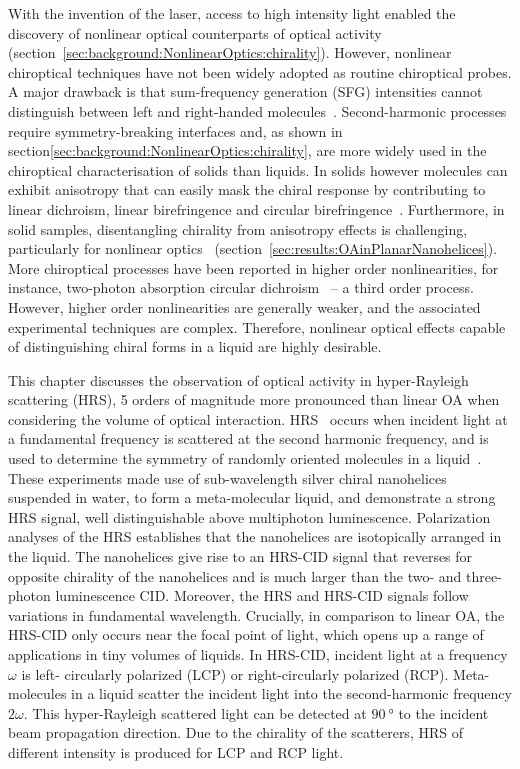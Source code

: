 With the invention of the laser, access to high intensity light enabled the discovery of nonlinear optical counterparts of optical activity (section~\ref{sec:background:NonlinearOptics:chirality}). However, nonlinear chiroptical techniques have not been widely adopted as routine chiroptical probes. A major drawback is that sum-frequency generation (SFG) intensities cannot distinguish between left and right-handed molecules~\cite{Valev2013b}. 
Second-harmonic processes require symmetry-breaking interfaces and, as shown in section\ref{sec:background:NonlinearOptics:chirality}, are more widely used in the chiroptical characterisation of solids than liquids. In solids however molecules can exhibit anisotropy that can easily mask the chiral response by contributing to linear dichroism, linear birefringence and circular birefringence~\cite{Kuroda2001}.
Furthermore, in solid samples, disentangling chirality from anisotropy effects is challenging, particularly for nonlinear optics~\cite{Hooper2017} (section~\ref{sec:results:OAinPlanarNanohelices}). More chiroptical processes have been reported in higher order nonlinearities, for instance, two-photon absorption circular dichroism~\cite{Tinoco1975, DeBoni2008, Toro2010} – a third order process. However, higher order nonlinearities are generally weaker, and the associated experimental techniques are complex. Therefore, nonlinear optical effects capable of distinguishing chiral forms in a liquid are highly desirable. 

This chapter discusses the observation of optical activity in hyper-Rayleigh scattering (HRS), 5 orders of magnitude more pronounced than linear OA when considering the volume of optical interaction. HRS~\cite{Clays1991b, Clays1992} occurs when incident light at a fundamental frequency is scattered at the second harmonic frequency, and is used to determine the symmetry of randomly oriented molecules in a liquid~\cite{Verbiest1994a}.
These experiments made use of sub-wavelength silver chiral nanohelices suspended in water, to form a meta-molecular liquid, and demonstrate a strong HRS signal, well distinguishable above multiphoton luminescence. Polarization analyses of the HRS establishes that the nanohelices are isotopically arranged in the liquid. The nanohelices give rise to an HRS-CID signal that reverses for opposite chirality of the nanohelices and is much larger than the two- and three-photon luminescence CID. Moreover, the HRS and HRS-CID signals follow variations in fundamental wavelength. Crucially, in comparison to linear OA, the HRS-CID only occurs near the focal point of light, which opens up a range of applications in tiny volumes of liquids. 
In HRS-CID, incident light at a frequency $\omega$ is left- circularly polarized (LCP) or right-circularly polarized (RCP). Meta-molecules in a liquid scatter the incident light into the second-harmonic frequency $2\omega$. This hyper-Rayleigh scattered light can be detected at $\SI{90}{\degree}$ to the incident beam propagation direction. Due to the chirality of the scatterers, HRS of different intensity is produced for LCP and RCP light.


